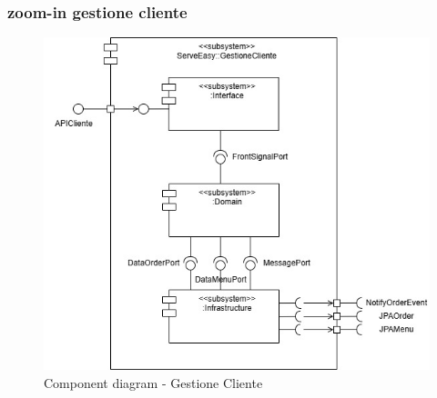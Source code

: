 \subsubsection{zoom-in gestione cliente}
\begin{figure}[H]
	\centering
	\includegraphics[scale=0.5]{iterazione1/images/GestioneCliente_subsystem-GestioneCliente.jpg}
	\caption{Component diagram - Gestione Cliente \label{fig:component_diagram_gestione_cliente}}
\end{figure}

